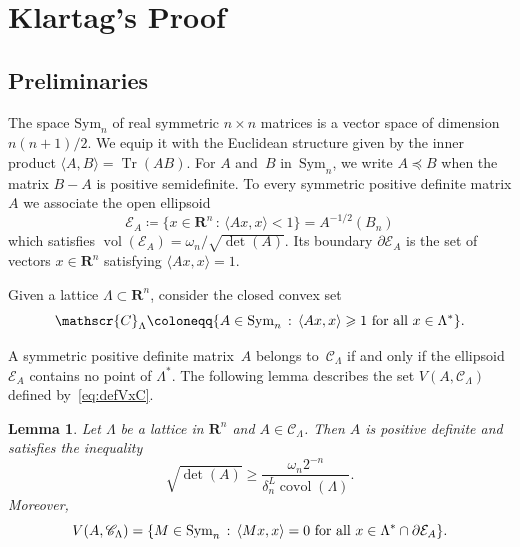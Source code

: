 \documentclass[12pt]{amsart}
\newcommand{\R}{\mathbf{R}}
\newcommand{\Sym}{\mathrm{Sym}}
\DeclareMathOperator{\tr}{Tr}
\DeclareMathOperator{\vol}{vol}
\DeclareMathOperator{\covol}{covol}
\newcommand{\scalar}[2]{\langle #1 , #2\rangle}
\renewcommand{\geq}{\geqslant}
\theoremstyle{plain}
\newtheorem{lemma}[theorem]{Lemma}
\theoremstyle{remark}
\begin{document}
\section{Klartag's Proof} \label{sec:klartag}
 
\subsection{Preliminaries}
 
The space $\Sym_n$ of real symmetric $n \times n$ matrices is a vector space of dimension $n(n+1)/2$. We equip it with the Euclidean structure given by the inner product $\scalar{A}{B} = \tr (AB)$. For $A$ and~$B$ in~$\Sym_n$, we write $A \preccurlyeq B$ when the matrix $B-A$ is positive semidefinite. To every symmetric positive definite matrix $A$ we associate the open ellipsoid
\[ \mathcal{E}_A \coloneqq \{ x \in \R^n \, : \, \scalar{Ax}{x} < 1 \}
 = A^{-1/2}(B_n) \]
which satisfies $\vol(\mathcal{E}_A) = \omega_n / \sqrt{\det(A)}$. Its boundary $\partial \mathcal{E}_A$ is the set of vectors $x \in \R^n$ satisfying $\scalar{Ax}{x}=1$.
 
Given a lattice $\Lambda \subset \R^n$, consider the closed convex set
\[ \mathscr{C}_\Lambda \coloneqq \{ A \in \Sym_n \, : \, \scalar{Ax}{x} \geq 1 \textnormal{ for all } x \in \Lambda^* \}.\]
 
A symmetric positive definite matrix~$A$ belongs to~$\mathscr{C}_\Lambda$ if and only if the ellipsoid~$\mathcal{E}_A$ contains no point of $\Lambda^*$. The following lemma describes the set $V(A,\mathscr{C}_\Lambda)$ defined by~\eqref{eq:defVxC}.
 
\begin{lemma} \label{lemme:CL}
Let $\Lambda$ be a lattice in $\R^n$ and $A \in \mathscr{C}_\Lambda$. Then $A$ is positive definite and satisfies the inequality
\begin{equation}
\label{eq:detlowerbound}
\sqrt{\det(A)} \geq \frac{\omega_n 2^{-n}}{ \delta_n^L \covol(\Lambda) } . \end{equation}
Moreover,
\[ V(A,\mathscr{C}_\Lambda) = \{ M \in \Sym_n \, : \,  \scalar{Mx}{x} =0 \textnormal{ for all } x \in \Lambda^* \cap \partial\mathcal{E}_A \}. \]
\end{lemma}
 
\end{document}
